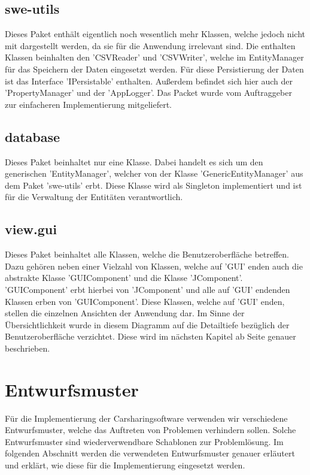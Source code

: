 \subsection{swe-utils}

Dieses Paket enthält eigentlich noch wesentlich mehr Klassen, welche jedoch nicht mit dargestellt werden, da sie für die Anwendung irrelevant sind. Die enthalten Klassen beinhalten den 'CSVReader' und 'CSVWriter', welche im EntityManager für das Speichern der Daten eingesetzt werden. Für diese Persistierung der Daten ist das Interface 'IPersistable' enthalten. Außerdem befindet sich hier auch der 'PropertyManager' und der 'AppLogger'. Das Packet wurde vom Auftraggeber zur einfacheren Implementierung mitgeliefert. 

\subsection{database}
Dieses Paket beinhaltet nur eine Klasse. Dabei handelt es sich um den generischen 'EntityManager', welcher von der Klasse 'GenericEntityManager' aus dem Paket 'swe-utils' erbt. Diese Klasse wird als Singleton implementiert und ist für die Verwaltung der Entitäten verantwortlich.

\subsection{view.gui}
Dieses Paket beinhaltet alle Klassen, welche die Benutzeroberfläche betreffen. Dazu gehören neben einer Vielzahl von Klassen, welche auf 'GUI' enden auch die abstrakte Klasse 'GUIComponent' und die Klasse 'JComponent'. 'GUIComponent' erbt hierbei von 'JComponent' und alle auf 'GUI' endenden Klassen erben von 'GUIComponent'. Diese Klassen, welche auf 'GUI' enden, stellen die einzelnen Ansichten der Anwendung dar. Im Sinne der Übersichtlichkeit wurde in diesem Diagramm auf die Detailtiefe bezüglich der Benutzeroberfläche verzichtet. Diese wird im nächsten Kapitel ab Seite \pageref{chapter:gui} genauer beschrieben.

\section{Entwurfsmuster}
Für die Implementierung der Carsharingsoftware verwenden wir verschiedene Entwurfsmuster, welche das Auftreten von Problemen verhindern sollen. Solche Entwurfsmuster sind wiederverwendbare Schablonen zur Problemlösung. Im folgenden Abschnitt werden die verwendeten Entwurfsmuster genauer erläutert und erklärt, wie diese für die Implementierung eingesetzt werden. 

